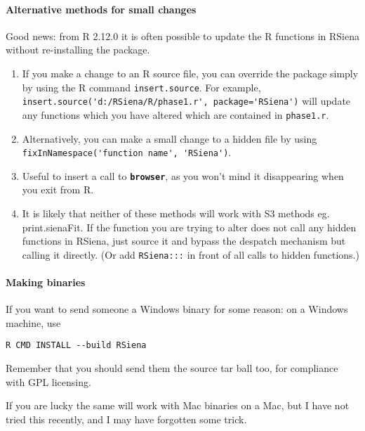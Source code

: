 \documentclass[12pt, a4paper]{article}
\renewcommand{\=}{\,=\,}
\newcommand{\+}{\,+\,}
\newcommand{\sfn}[1]{\textbf{\texttt{#1}}}
\begin{document}
\paragraph{Alternative methods for small changes}
Good news: from R 2.12.0 it is often possible to update the R functions in
RSiena without re-installing the
package.
\begin{enumerate}
\item If you make a change to an R source file, you can override the package
  simply by using the R command \verb|insert.source|. For example,
  \verb|insert.source('d:/RSiena/R/phase1.r', package='RSiena')| will update any
  functions which you have altered which are contained in \verb|phase1.r|.
\item Alternatively, you can make a small change to a hidden file by using
\verb|fixInNamespace('function name', 'RSiena')|.
\item Useful to insert a call to \sfn{browser}, as you won't mind it
  disappearing when you exit from R.
\item It is likely that neither of these methods will work with S3 methods
  eg. print.sienaFit. If the function you are trying to alter does not call any
  hidden functions in RSiena, just source it and bypass the despatch mechanism
  but calling it directly. (Or add \verb|RSiena:::| in front of all calls to
  hidden functions.)
\end{enumerate}
\paragraph{Making  binaries}
If you want to send someone a Windows binary for some reason: on a Windows
machine, use

\verb|R CMD INSTALL --build RSiena|

Remember that you should send them the source tar ball too, for compliance with
GPL licensing.

If you are lucky the same will work with Mac binaries on a Mac, but I have not
tried this recently, and I may have forgotten some trick.
\end{document}
